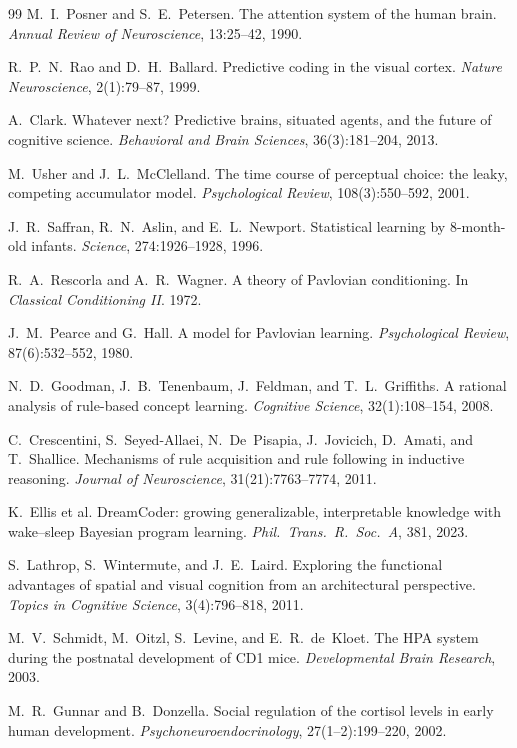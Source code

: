 \documentclass[11pt]{article}
\begin{document}
\begin{thebibliography}{99}
 M.~I.~Posner and S.~E.~Petersen. The attention system
of the human brain. \emph{Annual Review of Neuroscience}, 13:25--42,
1990.

 R.~P.~N.~Rao and D.~H.~Ballard. Predictive coding in the
visual cortex. \emph{Nature Neuroscience}, 2(1):79--87, 1999.

 A.~Clark. Whatever next? Predictive brains, situated
agents, and the future of cognitive science. \emph{Behavioral and
Brain Sciences}, 36(3):181--204, 2013.

 M.~Usher and J.~L.~McClelland. The time course of
perceptual choice: the leaky, competing accumulator model.
\emph{Psychological Review}, 108(3):550--592, 2001.

 J.~R.~Saffran, R.~N.~Aslin, and E.~L.~Newport.
Statistical learning by 8-month-old infants. \emph{Science},
274:1926--1928, 1996.

 R.~A.~Rescorla and A.~R.~Wagner. A theory of
Pavlovian conditioning. In \emph{Classical Conditioning II}. 1972.

 J.~M.~Pearce and G.~Hall. A model for Pavlovian
learning. \emph{Psychological Review}, 87(6):532--552, 1980.

 N.~D.~Goodman, J.~B.~Tenenbaum, J.~Feldman, and
T.~L.~Griffiths. A rational analysis of rule-based concept learning.
\emph{Cognitive Science}, 32(1):108--154, 2008.

 C.~Crescentini, S.~Seyed-Allaei, N.~De~Pisapia,
J.~Jovicich, D.~Amati, and T.~Shallice. Mechanisms of rule acquisition
and rule following in inductive reasoning. \emph{Journal of
Neuroscience}, 31(21):7763--7774, 2011.

 K.~Ellis et al. DreamCoder: growing generalizable,
interpretable knowledge with wake--sleep Bayesian program learning.
\emph{Phil.~Trans.~R.~Soc.~A}, 381, 2023.

 S.~Lathrop, S.~Wintermute, and J.~E.~Laird. Exploring the
functional advantages of spatial and visual cognition from an
architectural perspective. \emph{Topics in Cognitive Science},
3(4):796--818, 2011.

 M.~V.~Schmidt, M.~Oitzl, S.~Levine, and E.~R.~de~Kloet.
The HPA system during the postnatal development of CD1 mice.
\emph{Developmental Brain Research}, 2003.

 M.~R.~Gunnar and B.~Donzella. Social regulation of the
cortisol levels in early human development.
\emph{Psychoneuroendocrinology}, 27(1--2):199--220, 2002.


\end{thebibliography}
\end{document}

